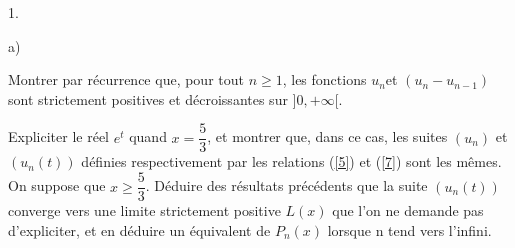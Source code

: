 \documentclass[11pt]{article}%
\begin{document}
\begin{noliste}{1.}
\begin{noliste}{a)}
\item Montrer par récurrence que, pour tout $n\geq 1$, les fonctions
$u_{n}$et $(u_{n}-u_{n-1})$ sont strictement positives et décroissantes
sur $]0, + \infty \lbrack $.

\item Expliciter le réel $e^{t}$ quand $x = \dfrac{5}{3}$, et montrer
que,
dans ce cas, les suites $(u_{n})$ et $(u_{n}(t))$ définies
respectivement
par les relations (\ref{5}) et (\ref{7}) sont les mêmes. \\
On suppose que $x\geq \dfrac{5}{3}$. Déduire des résultats précédents
que la suite $(u_{n}(t))$ converge vers une limite strictement positive
$L(x) $ que l'on ne demande pas d'expliciter, et en déduire un
équivalent de $P_{n}(x)$ lorsque n tend vers l'infini.
\end{noliste}
\end{noliste}

\label{fin}
\end{document}
